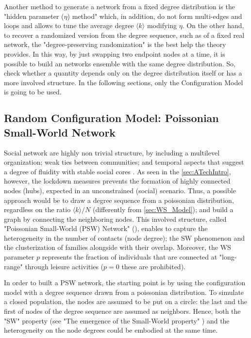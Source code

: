 \documentclass[a4paper,10pt,twoside]{book} %
\theoremstyle{definition}
\begin{document}
Another method to generate a network from a fixed degree distribution is the "hidden parameter ($\eta$) method" which, in addition, do not form multi-edges and loops \cite{barabasi::2016networkbook} and allows to tune the average degree $\langle k \rangle$ modifying $\eta$.
On the other hand, to recover a randomized version from the degree sequence, such as of a fixed real network, the "degree-preserving randomization" is the best help the theory provides. In this way, by just swapping two endpoint nodes at a time, it is possible to build an networks ensemble with the same degree distribution. So, check whether a quantity depends only on the degree distribution itself or has a more involved structure.
In the following sections, only the Configuration Model is going to be used.

\clearpage
\subsection{Random Configuration Model: Poissonian Small-World Network}
\label{sec:PSW_network}
Social network are highly non trivial structure, by including a multilevel organization; weak ties between communities; and temporal aspects that suggest a degree of fluidity with stable social cores \cite{Thurner::NetBasedExpl}.
As seen in the \autoref{sec:ATechIntro}, however, the lockdown measures prevents the formation of highly connected nodes (hubs), expected in an unconstrained (social) scenario. Thus, a possible approach would be to draw a degree sequence from a poissonian distribution, regardless on the ratio $\langle k \rangle / N$ (differently from \autoref{sec:WS_Model}); and build a graph by connecting the neighboring nodes.
This involved structure, called "Poissonian Small-World (PSW) Network" (\cite{Thurner::NetBasedExpl}), enables to capture the heterogeneity in the number of contacts (node degree); the SW phenomenon and the clusterization of families alongside with their overlap. Moreover, the WS parameter $p$ represents the fraction of individuals that are connected at "long-range" through leisure activities ($p = 0$ these are prohibited).

In order to built a PSW network, the starting point is by using the configuration model with a degree sequence drawn from a poissonian distribution. To simulate a closed population, the nodes are assumed to be put on a circle: the last and the first of nodes of the degree sequence are assumed as neighbors. Hence, both the "SW" property (see "The emergence of the Small-World property" ) and the heterogeneity on the node degrees could be embodied at the same time. 
\end{document}
